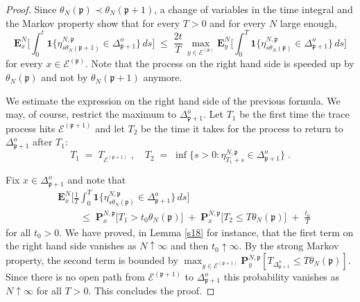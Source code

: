 \documentclass[reqno]{amsart}
\begin{document}
\begin{proof}
Since $\theta_N({{\mathfrak p}}) \prec \theta_N({{\mathfrak p}}+1)$, a change of variables
in the time integral and the Markov property show that for every
$T>0$ and for every $N$ large enough,
\begin{equation*}
{{\mathbf E}}^N_x \Big[ \int_0^t 
{{\mathbf 1}}\{ \eta^{N,{{\mathfrak p}}}_{s \theta_N({{\mathfrak p}}+1)} \in \Delta^o_{{{\mathfrak p}} +1} \} 
\, ds \Big] \;\le\; \frac {2t}T\,
\max_{y\in {{\mathcal E}}^{({{\mathfrak p}})}}  {{\mathbf E}}^N_y \Big[ \int_0^T
{{\mathbf 1}}\{ \eta^{N,{{\mathfrak p}}}_{s \theta_N({{\mathfrak p}})} \in \Delta^o_{{{\mathfrak p}} +1} \} 
\, ds \Big]
\end{equation*}
for every $x\in {{\mathcal E}}^{({{\mathfrak p}})}$. Note that the process on the right
hand side is speeded up by $\theta_N({{\mathfrak p}})$ and not by $\theta_N({{\mathfrak p}}+1)$ anymore.

We estimate the expression on the right hand side of the previous
formula. We may, of course, restrict the maximum to $\Delta^o_{{{\mathfrak p}}
  +1}$. Let $T_1$ be the first time the trace process hits ${{\mathcal E}}^{({{\mathfrak p}}+1)}$ and let $T_2$ be the time it takes for the process to
return to $\Delta^o_{{{\mathfrak p}} +1}$ after $T_1$:
\begin{equation*}
T_1 \;=\; T_{{{\mathcal E}}^{({{\mathfrak p}}+1)}}\; , \quad
T_2 \;=\; \inf \big\{ s> 0 : \eta^{N,{{\mathfrak p}}}_{T_1+s} \in \Delta^o_{{{\mathfrak p}}
  +1}\big\} \; .
\end{equation*}

Fix $x\in \Delta^o_{{{\mathfrak p}} +1}$ and note that
\begin{equation*}
\begin{split}
&  {{\mathbf E}}^N_x \Big[ \frac 1T \int_0^T
{{\mathbf 1}}\{ \eta^{N,{{\mathfrak p}}}_{s \theta_N({{\mathfrak p}})} \in \Delta^o_{{{\mathfrak p}} +1} \} 
\, ds \Big]  \\
& \qquad \;\le\; 
{{\mathbf P}}^{N,{{\mathfrak p}}}_x \big[ T_1 > t_0 \theta_N({{\mathfrak p}}) \big]\; +\; 
{{\mathbf P}}^{N,{{\mathfrak p}}}_x \big[ T_{2} \le T \theta_N({{\mathfrak p}}) \big] 
\;+\; \frac{t_0}T
\end{split}
\end{equation*}
for all $t_0>0$. We have proved, in Lemma \ref{s18} for instance, that
the first term on the right hand side vanishes as $N\uparrow\infty$
and then $t_0\uparrow\infty$. By the strong Markov property, the
second term is bounded by $\max_{y\in {{\mathcal E}}^{({{\mathfrak p}}+1)}} {{\mathbf P}}^{N,{{\mathfrak p}}}_y [ 
T_{\Delta^o_{{{\mathfrak p}} +1}} \le T \theta_N({{\mathfrak p}}) ]$. Since there is no
open path from ${{\mathcal E}}^{({{\mathfrak p}}+1)}$ to $\Delta^o_{{{\mathfrak p}} +1}$ this
probability vanishes as $N\uparrow\infty$ for all $T>0$. This
concludes the proof.
\end{proof}
\end{document}
